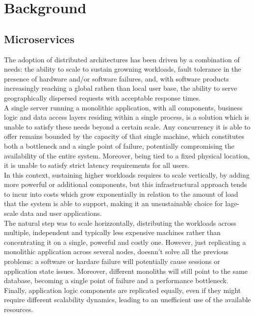 \chapter{Background}\label{chap:background}

\section{Microservices}
The adoption of distributed architectures has been driven by a combination of
needs: the ability to scale to sustain growning workloads, fault tolerance in
the presence of hardware and/or software failures, and, with software products
increasingly reaching a global rathen than local user base, the ability to serve
geographically dispersed requests with acceptable response times. \\
A single server running a monolithic application, with all components,
business logic and data access layers residing within a single process, is a
solution which is unable to satisfy these needs beyond a certain scale. Any
concurrency it is able to offer remains bounded by the capacity of that single
machine, which constitutes both a bottleneck and a single point of failure,
potentially compromising the availability of the entire system. Moreover, being
tied to a fixed physical location, it is unable to satisfy strict latency
requirements for all users.\\
In this context, sustaining higher workloads requires to scale vertically, by
adding more powerful or additional components, but this infrastructural approach
tends to incur into costs which grow exponentially in relation to the amount of
load that the system is able to support, making it an unsustainable choice for
lage-scale data and user applications.\\ 

The natural step was to scale horizzontally, distributing the workloads across
multiple, independent and typically less expensive machines rather than
concentrating it on a single, powerful and costly one. However, just replicating
a monolithic application across several nodes, doesnn't solve all the previous
problems: a software or hardare failure will potentially cause sessions or
application state issues. Moreover, different monoliths will still point to the
same database, becoming a single point of failure and a performance bottleneck.
Finally, application logic components are replicated equally, even if they
might require different scalability dynamics, leading to an unefficient use of
the available resources. 

